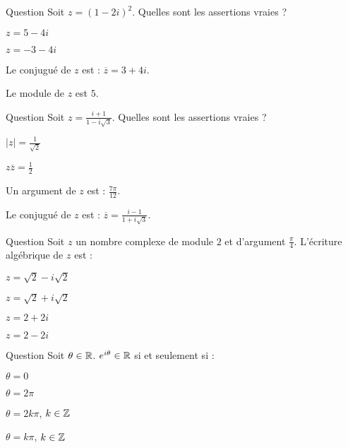 

\begin{multi}[multiple,feedback=
{On développe \((1-2i)^2\). Si \(z=a+ib, a,b \in \Rr, \overline{z}=a-ib\)  et \(|z|^2= a^2+b^2\). 
}]{Question}
Soit \(z=(1-2i)^2\). Quelles sont les assertions vraies ?

    \item \(z=5-4i\)
    \item* \(z=-3-4i\)
    \item Le conjugué de \(z\) est : \(\overline{z}=3+4i\).
    \item* Le module de \(z\) est \(5\).
\end{multi}


\begin{multi}[multiple,feedback=
{On applique les formules :
\(|\frac{z_1}{z_2}|= \frac{|z_1|}{|z_2|}\), \(|z|^2=z\overline{z}\) et \(\arg(\frac{z_1}{z_2})= \arg z_1 - \arg z_2 \, [2\pi]\). 
}]{Question}
Soit \(z=\frac{i+1}{1-i\sqrt 3}\). Quelles sont les assertions vraies ?

    \item* \(|z|=\frac{1}{\sqrt 2}\)
    \item* \(z\overline{z} =\frac{1}{2}\)
    \item* Un argument de \(z\) est : \(\frac{7\pi}{12}\).
    \item Le conjugué de \(z\) est : \(\overline{z}=\frac{i-1}{1+i\sqrt 3}\).
\end{multi}


\begin{multi}[multiple,feedback=
{\(z=2(\cos\frac{\pi}{4}+i\sin\frac{\pi}{4}) =\sqrt 2+i\sqrt 2 \).
}]{Question}
Soit \(z\) un nombre complexe de module \(2\) et d'argument \(\frac{\pi}{4}\). L'écriture algébrique de \(z\) est :

    \item \(z= \sqrt 2-i\sqrt 2\)
    \item* \(z= \sqrt 2+i\sqrt 2\)
    \item \(z= 2+2i\)
    \item \(z= 2-2i\)
\end{multi}


\begin{multi}[multiple,feedback=
{\(e^{i\theta}= \cos \theta + i \sin \theta \) et \(\sin \theta = 0 \) si et seulement si \(\theta  =k\pi\), \(k \in \Zz\).
}]{Question}
Soit \(\theta \in \mathbb{R}\). \(e^{i\theta}\in \mathbb{R}\)  si et seulement si :

    \item \(\theta  =0\)
    \item \(\theta  =2\pi\)
    \item \(\theta  = 2k\pi\), \(k \in \Zz\)
    \item* \(\theta  =k\pi\), \(k \in \Zz\)
\end{multi}


